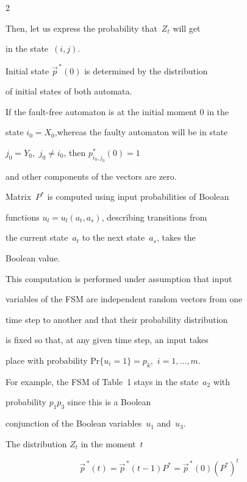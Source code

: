\begin{multicols}{2}
\begin{itemize}
\end{itemize}



Then, let us express the probability that~$Z_t$ will get

in the state~$(i,j)$.



Initial state $\vec p^{\,*}(0)$ is determined by the distribution

of initial states of both automata.

If the fault-free automaton is at the initial moment 0 in the

state $i_0=X_0$,whereas the faulty automaton will be in state

$j_0=Y_0$,\  $j_0 \ne i_0$, then $p^*_{i_0,j_0}(0) = 1$

and other components of the vectors are zero.



Matrix~$P^*$ is computed using input probabilities of Boolean

functions $u_l=u_l(a_t,a_s)$, describing  transitions from

the current state~$a_t$ to the next state~$a_s$, takes the

Boolean value.

This computation  is performed under assumption that input

variables of the FSM are independent random vectors from one

time step to another and that their probability distribution

is fixed so that, at any given time step, an input takes

place with probability $\mathrm{Pr}\{u_i=1\}=p_k$,\  $i=1,\ldots,m$.

For example, the FSM of Table~1 stays in the state~$a_2$ with

probability $p_1 p_3$ since this is a Boolean

conjunction of the Boolean variables~$u_1$ and~$u_3$.



The distribution $Z_t$ in the moment~$t$

\begin{equation}

\vec p^{\,*}(t)

=

\vec p^{\,*}(t-1) P^* = \vec p^{\,*}(0)(P^*)^t             \label{e2fr}

\end{equation}


\end{multicols}
